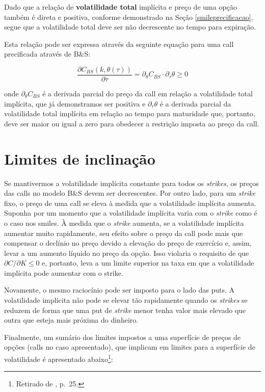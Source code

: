 \documentclass[]{book}
\let\rmarkdownfootnote\footnote%
\def\footnote{\protect\rmarkdownfootnote}
\begin{document}
Dado que a relação de \textbf{volatilidade total} implícita e preço de
uma opção também é direta e positiva, conforme demonstrado na Seção
\ref{smileprecificacao}, segue que a volatilidade total deve ser não
decrescente no tempo para expiração.

Esta relação pode ser expressa através da seguinte equação para uma call
precificada através de B\&S:

\begin{equation}
\frac{\partial C_{BS}(k, \theta(\tau))}{\partial \tau}=\partial_\theta C_{BS}\cdot\partial_\tau \theta \geq 0
\label{eq:arbcalendario}
\end{equation}

onde \(\partial_\theta C_{BS}\) é a derivada parcial do preço da call em
relação a volatilidade total implícita, que já demonstramos ser positiva
e \(\partial_\tau \theta\) é a derivada parcial da volatilidade total
implícita em relação ao tempo para maturidade que, portanto, deve ser
maior ou igual a zero para obedecer a restrição imposta ao preço da
call.

\section{Limites de inclinação}\label{limites-de-inclinacao}

Se mantivermos a volatilidade implícita constante para todos os
\emph{strikes}, os preços das calls no modelo B\&S devem ser
decrescentes. Por outro lado, para um \emph{strike} fixo, o preço de uma
call se eleva à medida que a volatilidade implícita aumenta. Suponha por
um momento que a volatilidade implícita varia com o \emph{strike} como é
o caso nos smiles. À medida que o \emph{strike} aumenta, se a
volatilidade implícita aumentar muito rapidamente, seu efeito sobre o
preço da call pode mais que compensar o declínio no preço devido a
elevação do preço de exercício e, assim, levar a um aumento líquido no
preço da opção. Isso violaria o requisito de que
\(\partial C /\partial K \leq 0\) e, portanto, leva a um limite superior
na taxa em que a volatilidade implícita pode aumentar com o strike.

Novamente, o mesmo raciocínio pode ser imposto para o lado das puts. A
volatilidade implícita não pode se elevar tão rapidamente quando os
\emph{strikes} se reduzem de forma que uma put de \emph{strike} menor
tenha valor mais elevado que outra que esteja mais próxima do dinheiro.

Finalmente, um sumário dos limites impostos a uma superfície de preços
de opções (calls no caso apresentado), que implicam em limites para a
superfície de volatilidade é apresentado abaixo\footnote{Retirado de
  \citet{Aurell2014}, p.~25.}:
\end{document}
